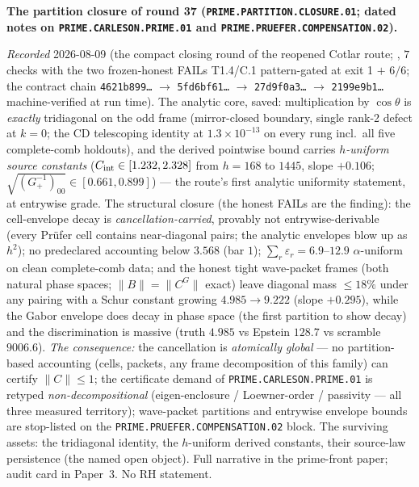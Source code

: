 \documentclass[11pt,a4paper]{article}
\begin{document}
\par\smallskip\noindent\textbf{The partition closure of round 37
(\texttt{PRIME.PARTITION.\allowbreak CLOSURE.01}; dated notes on
\texttt{PRIME.CARLESON.\allowbreak PRIME.01} and
\texttt{PRIME.PRUEFER.\allowbreak COMPENSATION.02}).}
{\sloppy
\emph{Recorded} 2026-08-09 (the compact closing round of the
reopened Cotlar route;
, $7$ checks with the
two frozen-honest FAILs T1.4/C.1 pattern-gated at exit 1 $+$
$6/6$; the contract chain \texttt{4621b899\ldots} $\to$
\texttt{5fd6bf61\ldots} $\to$ \texttt{27d9f0a3\ldots} $\to$
\texttt{2199e9b1\ldots} machine-verified at run time).  The
analytic core, saved: multiplication by $\cos\theta$ is
\emph{exactly} tridiagonal on the odd frame (mirror-closed
boundary, single rank-2 defect at $k = 0$; the CD telescoping
identity at $1.3\times10^{-13}$ on every rung incl.\ all five
complete-comb holdouts), and the derived pointwise bound carries
\emph{$h$-uniform source constants} ($C_{\rm int} \in [1.232,
2.328]$ from $h = 168$ to $1445$, slope $+0.106$;
$\sqrt{(G_+^{-1})_{00}} \in [0.661, 0.899]$) --- the route's
first analytic uniformity statement, at entrywise grade.  The
structural closure (the honest FAILs are the finding): the
cell-envelope decay is \emph{cancellation-carried}, provably not
entrywise-derivable (every Pr\"ufer cell contains near-diagonal
pairs; the analytic envelopes blow up as $h^2$); no predeclared
accounting below $3.568$ (bar $1$); $\sum_r \varepsilon_r =
6.9$--$12.9$ $\alpha$-uniform on clean complete-comb data; and
the honest tight wave-packet frames (both natural phase spaces;
$\|B\| = \|C^G\|$ exact) leave diagonal mass $\le 18\%$ under
any pairing with a Schur constant growing $4.985 \to 9.222$
(slope $+0.295$), while the Gabor envelope does decay in phase
space (the first partition to show decay) and the discrimination
is massive (truth $4.985$ vs Epstein $128.7$ vs scramble
$9006.6$).  \emph{The consequence:} the cancellation is
\emph{atomically global} --- no partition-based accounting
(cells, packets, any frame decomposition of this family) can
certify $\|C\| \le 1$; the certificate demand of
\texttt{PRIME.CARLESON.PRIME.01} is retyped
\emph{non-decompositional} (eigen-enclosure / Loewner-order /
passivity --- all three measured territory); wave-packet
partitions and entrywise envelope bounds are stop-listed on the
\texttt{PRIME.PRUEFER.COMPENSATION.02} block.  The surviving
assets: the tridiagonal identity, the $h$-uniform derived
constants, their source-law persistence (the named open object).
Full narrative in the prime-front paper; audit card in
Paper~3.  No RH statement.\par}
\end{document}
